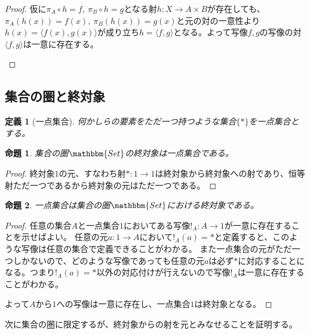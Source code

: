 \documentclass[uplatex,dvipdfmx]{jsarticle}
\newcommand{\cat}[1]{\mathbbm{#1}}
\newcommand{\arrow}{\rightarrow}
\newcommand{\tuple}[1]{\langle #1\rangle}
\newcommand{\mor}[3]{#1:#2\arrow #3}
\newtheorem{proof}{証明}[section]
\newtheorem{prop}{命題}[section]
\newtheorem{define}{定義}[section]
\numberwithin{proof}{subsection}
\numberwithin{prop}{subsection}
\numberwithin{define}{subsection}
\begin{document}
\begin{proof}
		仮に$\pi_A\circ h=f,\ \pi_B\circ h=g$となる射$\mor{h}{X}{A\times B}$が存在しても、
		$\pi_A(h(x))=f(x),\ \pi_B(h(x))=g(x)$と元の対の一意性より$h(x)=\tuple{f(x),g(x)}$が成り立ち$h=\tuple{f,g}$となる。よって写像$f,g$の写像の対$\tuple{f,g}$は一意に存在する。
		\begin{center}
		\end{center}
	\end{proof}
	
  \subsection{集合の圏と終対象}
	\begin{define}[一点集合]
		何かしらの要素をただ一つ持つような集合$\{*\}$を一点集合とする。
	\end{define}
	\begin{prop}
		集合の圏$\cat{Set}$の終対象は一点集合である。
	\end{prop}
	\begin{proof}
		終対象$1$の元、すなわち射$\mor{*}{1}{1}$は終対象から終対象への射であり、恒等射ただ一つであるから終対象の元はただ一つである。
	\end{proof}
	\begin{prop}
		一点集合は集合の圏$\cat{Set}$における終対象である。
	\end{prop}
	\begin{proof}
		任意の集合$A$と一点集合$1$においてある写像$\mor{!_A}{A}{1}$が一意に存在することを示せばよい。
		任意の元$\mor{a}{1}{A}$において$!_A(a)=*$と定義すると、このような写像は任意の集合で定義できることがわかる。
		また一点集合の元がただ一つしかないので、どのような写像であっても任意の元$a$は必ず$*$に対応することになる。つまり$!_A(a)=*$以外の対応付けが行えないので写像$!_A$は一意に存在することがわかる。

		よって$A$から$1$への写像は一意に存在し、一点集合$1$は終対象となる。
	\end{proof}
	次に集合の圏に限定するが、終対象からの射を元とみなせることを証明する。
\end{document}
